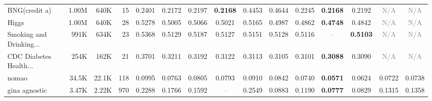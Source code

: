 \begin{table}[t]
{\begin{tabular}{lrrrccccccccccc}
BNG(credit a) & 1.00M & 640K & 15 & \cellcolor[HTML]{E0ECD2}0.2401 & \cellcolor[HTML]{D9EAD3}0.2172 & \cellcolor[HTML]{DAEAD3}0.2197 & \cellcolor[HTML]{D9EAD3}\textbf{0.2168} & \cellcolor[HTML]{F6D2CC}0.4453 & \cellcolor[HTML]{F4CCCC}0.4644 & \cellcolor[HTML]{DBEAD3}0.2245 & \cellcolor[HTML]{D9EAD3}\textbf{0.2168} & \cellcolor[HTML]{DAEAD3}0.2192 & \textcolor{gray}{N/A} & \textcolor{gray}{N/A} \\
Higgs & 1.00M & 640K & 28 & \cellcolor[HTML]{F4CCCC}0.5278 & \cellcolor[HTML]{FEF2CC}0.5005 & \cellcolor[HTML]{FDEACC}0.5066 & \cellcolor[HTML]{FFF1CC}0.5021 & \cellcolor[HTML]{F9DCCC}0.5165 & \cellcolor[HTML]{FBF1CD}0.4987 & \cellcolor[HTML]{E9EDD0}0.4862 & \cellcolor[HTML]{D9EAD3}\textbf{0.4748} & \cellcolor[HTML]{E6EDD1}0.4842 & \textcolor{gray}{N/A} & \textcolor{gray}{N/A} \\
Smoking and Drinking... & 991K & 634K & 23 & \cellcolor[HTML]{F4CCCC}0.5368 & \cellcolor[HTML]{E0ECD2}0.5129 & \cellcolor[HTML]{F1EFCF}0.5187 & \cellcolor[HTML]{E0EBD2}0.5127 & \cellcolor[HTML]{E7EDD0}0.5151 & \cellcolor[HTML]{E0ECD2}0.5128 & \cellcolor[HTML]{DDEBD2}0.5116 & \textcolor{gray}{--} & \cellcolor[HTML]{D9EAD3}\textbf{0.5103} & \textcolor{gray}{N/A} & \textcolor{gray}{N/A} \\
CDC Diabetes Health... & 254K & 162K & 21 & \cellcolor[HTML]{F4CCCC}0.3701 & \cellcolor[HTML]{E8EDD0}0.3211 & \cellcolor[HTML]{E6EDD1}0.3192 & \cellcolor[HTML]{DDEBD2}0.3122 & \cellcolor[HTML]{DCEBD2}0.3113 & \cellcolor[HTML]{DBEAD3}0.3105 & \cellcolor[HTML]{DBEAD3}0.3101 & \cellcolor[HTML]{D9EAD3}\textbf{0.3088} & \cellcolor[HTML]{D9EAD3}0.3090 & \textcolor{gray}{N/A} & \textcolor{gray}{N/A} \\
nomao & 34.5K & 22.1K & 118 & \cellcolor[HTML]{F4CCCC}0.0995 & \cellcolor[HTML]{FBF1CD}0.0763 & \cellcolor[HTML]{FEEECC}0.0805 & \cellcolor[HTML]{FEF0CC}0.0793 & \cellcolor[HTML]{F8DBCC}0.0910 & \cellcolor[HTML]{FCE7CC}0.0842 & \cellcolor[HTML]{F7F0CD}0.0740 & \cellcolor[HTML]{D9EAD3}\textbf{0.0571} & \cellcolor[HTML]{E2ECD1}0.0624 & \cellcolor[HTML]{F4F0CE}0.0722 & \cellcolor[HTML]{F7F0CD}0.0738 \\
gina agnostic & 3.47K & 2.22K & 970 & \cellcolor[HTML]{F7D7CC}0.2288 & \cellcolor[HTML]{FEEECC}0.1766 & \cellcolor[HTML]{FCF1CD}0.1592 & \textcolor{gray}{--} & \cellcolor[HTML]{F4CCCC}0.2549 & \cellcolor[HTML]{DEEBD2}0.0883 & \cellcolor[HTML]{EBEED0}0.1190 & \cellcolor[HTML]{D9EAD3}\textbf{0.0777} & \cellcolor[HTML]{DBEAD3}0.0829 & \cellcolor[HTML]{F0EFCF}0.1315 & \cellcolor[HTML]{F2EFCE}0.1358 \\
\bottomrule
\end{tabular}%
}
\vspace{2pt}
\begin{minipage}{0.99\textwidth}
\end{minipage}
\end{table}